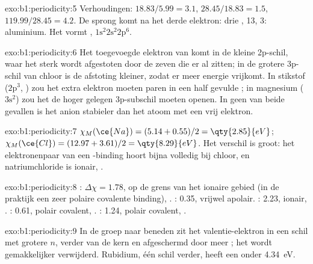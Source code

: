 \begin{solution}{exo:b1:periodicity:5}
Verhoudingen: $18.83/5.99 = 3.1$, $28.45/18.83 = 1.5$, $119.99/28.45 = 4.2$.
De sprong komt na het derde elektron: drie , 
13,  3: aluminium. Het vormt , $1\text{s}^2 2\text{s}^2
2\text{p}^6$.
\end{solution}

\begin{solution}{exo:b1:periodicity:6}
Het toegevoegde elektron van  komt in de kleine 2p-schil, waar
het sterk wordt afgestoten door de zeven  die er al
zitten; in de grotere 3p-schil van chloor is de afstoting kleiner, zodat
er meer energie vrijkomt. In stikstof ($2\text{p}^3$, )
zou het extra elektron moeten paren in een half gevulde ; in
magnesium ($3\text{s}^2$) zou het de hoger gelegen 3p-subschil moeten
openen. In geen van beide gevallen is het anion stabieler dan het atoom
met een vrij elektron.
\end{solution}

\begin{solution}{exo:b1:periodicity:7}
$\chi_M(\ce{Na}) = (5.14 + 0.55)/2 = \qty{2.85}{eV}$; $\chi_M(\ce{Cl}) =
(12.97 + 3.61)/2 = \qty{8.29}{eV}$. Het verschil is groot: het
elektronenpaar van een -binding hoort bijna volledig bij
chloor, en natriumchloride is ionair, .
\end{solution}

\begin{solution}{exo:b1:periodicity:8}
: $\Delta\chi = 1.78$, op de grens van het ionaire gebied (in
de praktijk een zeer polaire covalente binding), .
: 0.35, vrijwel apolair. : 2.23, ionair, .
: 0.61, polair covalent, .
: 1.24, polair covalent, .
\end{solution}

\begin{solution}{exo:b1:periodicity:9}
In de groep naar beneden zit het valentie-elektron in een schil met
grotere $n$, verder van de kern en afgeschermd door meer ;
het wordt gemakkelijker verwijderd. Rubidium, één schil verder, heeft een
 onder \qty{4.34}{eV}.
\end{solution}

